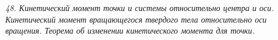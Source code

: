 \emph{48. Кинетический момент точки и системы относительно центра и оси.
Кинетический момент вращающегося твердого тела относительно оси вращения.
Теорема об изменении кинетического момента для точки.}

\newpage
